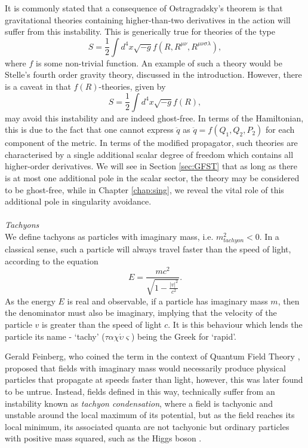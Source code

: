 It is commonly stated that a consequence of Ostragradsky's theorem is that gravitational theories containing higher-than-two derivatives in the action will suffer from this instability. This is generically true for theories of the type
\[
S=\frac{1}{2}\int d^4x \sqrt{-g} f(R,R^{\mu\nu},R^{\mu\nu\sigma\lambda})
,\]
where $f$ is some non-trivial function. An example of such a theory would be Stelle's fourth order gravity theory, discussed in the introduction. However, there is a caveat in that $f(R)$-theories, given by
\[
S=\frac{1}{2}\int d^4x \sqrt{-g} f(R),
\]
may avoid this instability and are indeed ghost-free. In terms of the Hamiltonian, this is due to the fact that one cannot express ${\ddot q}$ as ${\ddot q}=f(Q_1,Q_2,P_2)$ for each component of the metric. In terms of the modified propagator, such theories are characterised by a single additional scalar degree of freedom which contains all higher-order derivatives. We will see in Section \ref{sec:GFST} that as long as there is at most one additional pole in the scalar sector, the theory may be considered to be ghost-free, while in Chapter \ref{chap:sing}, we reveal the vital role of this additional pole in singularity avoidance. 
 \\\\\emph{Tachyons} 
\\We define tachyons as particles with imaginary mass, i.e. $m^2_{tachyon}<0$. In a classical sense, such a particle will always travel faster than the speed of light, according to the equation
\[
E=\frac{mc^2}{\sqrt{1-\frac{|v|^2}{c^2}}}
.\]
As the energy $E$ is real and observable, if a particle has imaginary mass $m$, then the denominator must also be imaginary, implying that the velocity of the particle $v$ is greater than the speed of light $c$. It is this behaviour which lends the particle its name - `tachy' ($\tau\alpha\chi\acute{\upsilon}\varsigma$) being the Greek for `rapid'.

Gerald Feinberg, who coined the term in the context of Quantum Field Theory  \cite{PhysRev.159.1089}, proposed that fields with imaginary mass would necessarily produce physical particles that propagate at speeds faster than light, however, this was later found to be untrue. Instead, fields defined in this way, technically suffer from an instability known as \emph{tachyon condensation}, where a field is tachyonic and unstable around the local maximum of its potential, but as the field reaches its local minimum, its associated quanta are not tachyonic but ordinary particles with positive mass squared, such as the Higgs boson \cite{Peskin:257493}.

